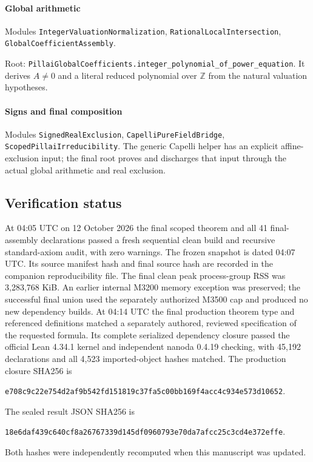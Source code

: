 \documentclass[11pt,letterpaper]{article}
\theoremstyle{remark}\newtheorem{remark}[theorem]{Remark}
\newcommand{\Z}{\mathbb Z}
\newcommand{\lean}[1]{{\small\urlstyle{tt}\nolinkurl{#1}}}
\begin{document}
\paragraph{Global arithmetic}\mbox{}\par\noindent
Modules \lean{IntegerValuationNormalization},
\lean{RationalLocalIntersection}, \lean{GlobalCoefficientAssembly}.\par\noindent Root:
\lean{PillaiGlobalCoefficients.integer_polynomial_of_power_equation}.
It derives $A\ne0$ and a literal reduced polynomial over $\Z$ from the
natural valuation hypotheses.
\paragraph{Signs and final composition}\mbox{}\par\noindent
Modules \lean{SignedRealExclusion}, \lean{CapelliPureFieldBridge},
\lean{ScopedPillaiIrreducibility}. The generic Capelli helper has an
explicit affine-exclusion input; the final root proves and discharges
that input through the actual global arithmetic and real exclusion.
\par\endgroup

\clearpage\subsection{Verification status}

At 04:05 UTC on 12 October 2026 the final scoped theorem and all 41 final-assembly
declarations passed a fresh sequential clean build and recursive
standard-axiom audit, with zero warnings. The frozen snapshot is dated
04:07 UTC. Its source manifest hash and final source hash are recorded in
the companion reproducibility file. The final clean peak process-group
RSS was 3,283,768 KiB. An earlier internal M3200 memory exception was
preserved; the successful final union used the separately authorized
M3500 cap and produced no new dependency builds.
At 04:14 UTC the final production theorem type and referenced definitions
matched a separately authored, reviewed specification of the requested
formula. Its complete serialized dependency closure passed the official
Lean 4.34.1 kernel and independent nanoda 0.4.19 checking, with 45,192
declarations and all 4,523 imported-object hashes matched.
The production closure SHA256 is
\begin{center}\small\nolinkurl{e708c9c22e754d2af9b542fd151819c37fa5c00bb169f4acc4c934e573d10652}.\end{center}
The sealed result JSON SHA256 is
\begin{center}\small\nolinkurl{18e6daf439c640cf8a26767339d145df0960793e70da7afcc25c3cd4e372effe}.\end{center}
Both hashes were independently recomputed when this manuscript was updated.
\end{document}
